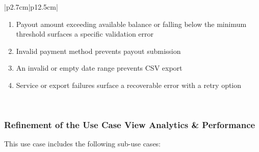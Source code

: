 \begin{table}[H]
\begin{tabular}{|p{2.7cm}|p{12.5cm}|}
\begin{minipage}[t]{\linewidth}
\begin{enumerate}[topsep=0pt,itemsep=1pt,parsep=0pt,partopsep=0pt]
                \item Payout amount exceeding available balance or falling below the minimum threshold surfaces a specific validation error
                \item Invalid payment method prevents payout submission
                \item An invalid or empty date range prevents CSV export
                \item Service or export failures surface a recoverable error with a retry option
            \end{enumerate}
        \end{minipage} \\
        \hline
    \end{tabular}
    \label{tab:teacher-earnings}
\end{table}

\subsubsection[Refinement of the Use Case View Analytics \& Performance]{Refinement of the Use Case View Analytics \& Performance} This use case includes
the following sub-use cases:

